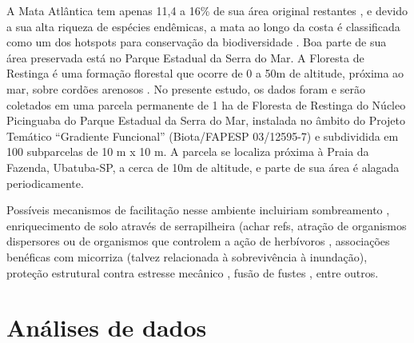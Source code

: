 \documentclass[twoside,12pt,a4paper]{report}
\begin{document}
A Mata Atlântica tem apenas 11,4 a 16\% de sua área original restantes \citep{Ribeiro2009}, e
devido a sua alta riqueza de espécies endêmicas, a mata ao longo da costa é classificada como um dos
hotspots para conservação da biodiversidade \citep{Myers2000}. Boa parte de sua área preservada
está no Parque Estadual da Serra do Mar. A Floresta de Restinga é uma formação florestal que ocorre
de 0 a 50m de altitude, próxima ao mar, sobre cordões arenosos \citep{Joly2008}. No presente
estudo, os dados foram e serão coletados em uma parcela permanente de 1 ha de Floresta de Restinga
do Núcleo Picinguaba do Parque Estadual da Serra do Mar, instalada no âmbito do Projeto Temático
“Gradiente Funcional” (Biota/FAPESP 03/12595-7) e subdividida em 100 subparcelas de 10 m x 10 m. A
parcela se localiza próxima à Praia da Fazenda, Ubatuba-SP, a cerca de 10m de altitude, e parte de
sua área é alagada periodicamente.

Possíveis mecanismos de facilitação nesse ambiente incluiriam sombreamento
\citep{Castanho2014}, enriquecimento de solo através de serrapilheira (achar refs, atração de
organismos dispersores \citep{achar refs CallawayBook} ou de organismos que controlem a ação de
herbívoros \citep{refs}, associações benéficas com micorriza \citep{Simard1997} (talvez
relacionada à sobrevivência à inundação\citep{Fougnies2007}), proteção
estrutural contra estresse mecânico \citep{refs}, fusão de fustes \citep{McIntire2011}, entre
outros.

\section{Análises de dados}
\end{document}
